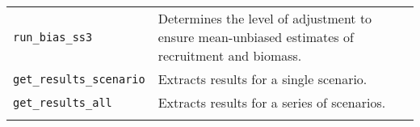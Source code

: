 \begin{longtable}[c]{@{}ll@{}}
\begin{minipage}[t]{0.32\columnwidth}
\texttt{run\_bias\_ss3}
\end{minipage} & \begin{minipage}[t]{0.57\columnwidth}\raggedright
Determines the level of adjustment to ensure mean-unbiased estimates of
recruitment and biomass.
\end{minipage}
\\\noalign{\medskip}
\begin{minipage}[t]{0.32\columnwidth}\raggedright
\texttt{get\_results\_scenario}
\end{minipage} & \begin{minipage}[t]{0.57\columnwidth}\raggedright
Extracts results for a single scenario.
\end{minipage}
\\\noalign{\medskip}
\begin{minipage}[t]{0.32\columnwidth}\raggedright
\texttt{get\_results\_all}
\end{minipage} & \begin{minipage}[t]{0.57\columnwidth}\raggedright
Extracts results for a series of scenarios.
\end{minipage}
\\\noalign{\medskip}
\hline
\end{longtable}
